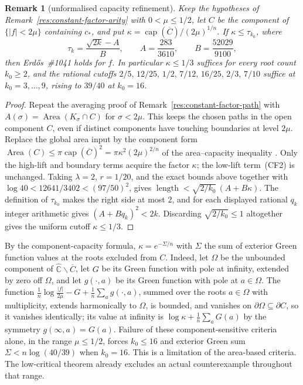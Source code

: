\documentclass[11pt]{article}
\newtheorem{remark}[theorem]{Remark}
\begin{document}
\begin{remark}[unformalised capacity refinement]
\label{res:constant-factor-capacity}
Keep the hypotheses of Remark~\ref{res:constant-factor-arity} with
$0<\mu\le1/2$, let $C$ be the component of $\{|f|<2\mu\}$ containing $c_*$, and
put $\kappa=\operatorname{cap}(\overline C)/(2\mu)^{1/n}$.  If
$\kappa\le\tau_{k_0}$, where
\[
 \tau_k=\frac{\sqrt{2k}-A}{B},\qquad
 A=\frac{283}{3610},\qquad B=\frac{52029}{9100},
\]
then Erd\H{o}s~\#1041 holds for $f$. In particular $\kappa\le1/3$ suffices for
every root count $k_0\ge2$, and the rational cutoffs
$2/5,\,12/25,\,1/2,\,7/12,\,16/25,\,2/3,\,7/10$ suffice at
$k_0=3,\ldots,9$, rising to $39/40$ at $k_0=16$.
\end{remark}


\begin{proof}
Repeat the averaging proof of Remark~\ref{res:constant-factor-path} with
$A(\sigma)=\operatorname{Area}(K_\sigma\cap C)$ for $\sigma<2\mu$.
This keeps the chosen paths in the open component $C$, even if distinct
components have touching boundaries at level $2\mu$. Replace the global
area input by the component form
$\operatorname{Area}(C)\le\pi\operatorname{cap}(\overline C)^2
 =\pi\kappa^2(2\mu)^{2/n}$ of the area--capacity inequality
\cite[Theorem~6]{crane}.  Only the high-lift and boundary terms acquire the
factor $\kappa$; the low-lift term~(CF2) is unchanged.  Taking $\lambda=2$,
$r=1/20$, and the exact bounds above together with
$\log40<12641/3402<(97/50)^2$, gives
$\operatorname{length}<\sqrt{2/k_0}\,(A+B\kappa)$.  The definition of
$\tau_{k_0}$ makes the right side at most $2$, and for each displayed rational
$q_k$ integer arithmetic gives $(A+Bq_k)^2<2k$.  Discarding
$\sqrt{2/k_0}\le1$ altogether gives the uniform cutoff $\kappa\le1/3$.
\end{proof}

By the component-capacity formula, $\kappa=e^{-\Sigma/n}$ with $\Sigma$ the sum
of exterior Green function values at the roots excluded from $C$.  Indeed, let
$\Omega$ be the unbounded component of
$\widehat{\mathbb C}\mathbin{\backslash}\overline C$,
let $G$ be its Green function with pole at infinity, extended by zero off
$\Omega$, and let $g(\cdot,a)$ be its Green function with pole at $a\in\Omega$.
The function $\frac1n\log\frac{|f|}{2\mu}-G+\frac1n\sum_a g(\cdot,a)$, summed
over the roots $a\in\Omega$ with multiplicity, extends harmonically to
$\Omega$, is bounded, and vanishes on $\partial\Omega\subseteq\partial C$, so it
vanishes identically; its value at infinity is $\log\kappa+\frac1n\sum_aG(a)$
by the symmetry $g(\infty,a)=G(a)$.  Failure of these component-sensitive
criteria alone, in the range $\mu\le1/2$, forces $k_0\le16$ and exterior
Green sum $\Sigma<n\log(40/39)$ when $k_0=16$.  This is a limitation of
the area-based criteria.  The low-critical theorem already excludes an actual
counterexample throughout that range.
\end{document}
